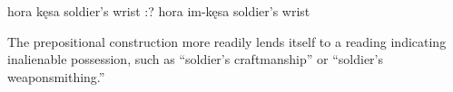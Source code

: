 \begin{subexamples}
    \ex \label{ex:inalien_poss}
        \script hora kęsa
        \tr soldier's wrist
    \ex
        \script:? hora im-kęsa
        \tr soldier's wrist
\end{subexamples}

The prepositional construction more readily lends itself to a reading indicating inalienable possession, such as “soldier's craftmanship” or “soldier's weaponsmithing.”






